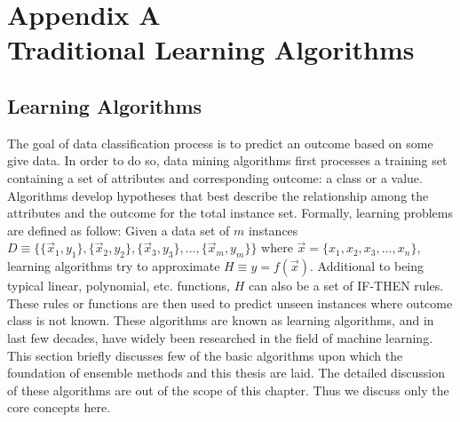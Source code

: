 \chapter*{Appendix A\\Traditional Learning Algorithms}

\section*{Learning Algorithms}
\label{sec:bg:learningalgos}
The goal of data classification process is to predict an outcome based on some give data. In order to do so, data mining algorithms first processes a training set containing a set of attributes and corresponding outcome: a class or a value. Algorithms develop hypotheses that best describe the relationship among the attributes and the outcome for the total instance set.  Formally, learning problems are defined as follow: Given a data set of $m$ instances  $D \equiv \{ \{\vec{x}_1, y_1\}, \{\vec{x}_2, y_2\}, \{\vec{x}_3, y_3\}, \dots, \{\vec{x}_m, y_m\} \}$ where $ \vec{x} = \{x_1, x_2, x_3, \dots, x_n\}$, learning algorithms try to approximate $H \equiv y = f(\vec{x})$. Additional to being typical linear, polynomial, etc. functions, $H$ can also be a set of IF-THEN rules. These rules or functions are then used to predict unseen instances where outcome class is not known. These algorithms are known as learning algorithms, and in last few decades, have widely been researched in the field of machine learning. This section briefly discusses few of the basic algorithms upon which the foundation of ensemble methods and this thesis are laid. The detailed discussion of these algorithms are out of the scope of this chapter. Thus we discuss only the core concepts here.

